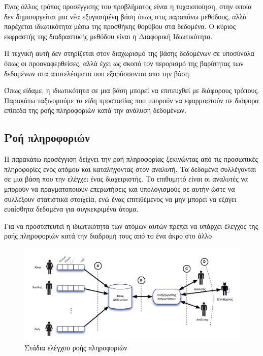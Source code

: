 Ένας άλλος τρόπος προσέγγισης του προβλήματος είναι η τυχαιοποίηση, στην οποία δεν δημιουργείται μια νέα εξυγιασμένη βάση όπως στις παραπάνω μεθόδους, αλλά παρέχεται ιδιωτικότητα μέσω της προσθήκης θορύβου στα δεδομένα. Ο κύριος εκφραστής της διαδραστικής μεθόδου είναι η Διαφορική Ιδιωτικότητα.

 Η τεχνική αυτή δεν στηρίζεται στον διαχωρισμό της βάσης δεδομένων σε υποσύνολα όπως οι προαναφερθείσες, αλλά έχει ως σκοπό τον περορισμό της βαρύτητας των δεδομένων στα αποτελέσματα που εξορύσσονται απο την βάση.


Όπως είδαμε, η ιδιωτικότητα σε μια βάση μπορεί να επιτευχθεί με διάφορους τρόπους. Παρακάτω ταξινομούμε τα είδη προστασίας που μπορούν να εφαρμοστούν σε διάφορα επίπεδα της ροής πληροφοριών κατά την ανάλυση δεδομένων.



\subsection{Ροή πληροφοριών}

Η παρακάτω προσέγγιση δείχνει την ροή πληροφορίας ξεκινώντας από τις προσωπικές πληροφορίες ενός ατόμου και καταλήγοντας στον αναλυτή. Τα δεδομένα συλλέγονται σε μια βάση που την ελέγχει ένας διαχειριστής. Το επιθυμητό είναι οι αναλυτές να μπορούν να πραγματοποιούν επερωτήσεις και υπολογισμούς σε αυτήν ώστε να συλλέξουν στατιστικά στοιχεία, ενώ ένας επιτιθέμενος να μην μπορεί να εξάγει ευαίσθητα δεδομένα για συγκεκριμένα άτομα.

Για να προστατευτεί η ιδιωτικότητα των ατόμων αυτών πρέπει να υπάρχει έλεγχος της ροής πληροφοριών κατά την διαδρομή τους από το ένα άκρο στο άλλο \textlatin{\cite{hay}}


\begin{figure}[h!]
  \includegraphics[width=\linewidth]{images/Hay.jpg}
  \caption{Στάδια ελέγχου ροής πληροφοριών}
\end{figure}


